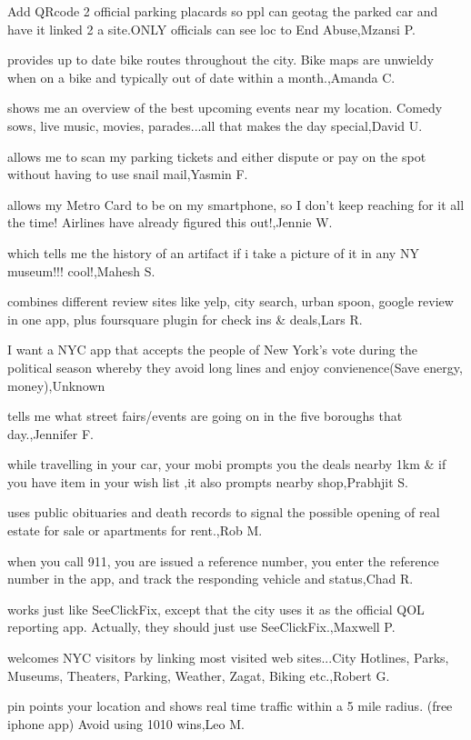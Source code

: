 \documentclass{article}
\begin{document}
Add QRcode 2 official parking placards so ppl can geotag the parked car and have it linked 2 a site.ONLY  officials can see loc to End Abuse,Mzansi P.

provides up to date bike routes throughout the city.  Bike maps are unwieldy when on a bike and typically out of date within a month.,Amanda C.

shows me an overview of the best upcoming events near my location. Comedy sows, live music, movies, parades...all that makes the day special,David U.

allows me to scan my parking tickets and either dispute or pay on the spot without having to use snail mail,Yasmin F.

allows my Metro Card to be on my smartphone, so I don't keep reaching for it all the time!  Airlines have already figured this out!,Jennie W.

which tells me the history of an artifact if i take a picture of it in any NY museum!!! cool!,Mahesh S.

combines different review sites like yelp, city search, urban spoon, google review in one app, plus foursquare plugin for check ins \& deals,Lars R.

I want a NYC app that accepts the people of New York's vote during the political season whereby they avoid long lines and enjoy convienence(Save energy, money),Unknown

tells me what street fairs/events are going on in the five boroughs that day.,Jennifer F.

while travelling in your car, your mobi prompts you the deals nearby 1km \& if you have item in your wish list ,it also prompts nearby shop,Prabhjit S.

uses public obituaries and death records to signal the possible opening of real estate for sale or apartments for rent.,Rob M.

when you call 911, you are issued a reference number, you enter the reference number in the app, and track the responding vehicle and status,Chad R.

works just like SeeClickFix, except that the city uses it as the official QOL reporting app.  Actually, they should just use SeeClickFix.,Maxwell P.

welcomes NYC visitors by linking most visited web sites...City Hotlines, Parks, Museums, Theaters, Parking, Weather, Zagat, Biking etc.,Robert G.

pin points your location and shows real time traffic within a 5 mile radius.  (free iphone app) Avoid using 1010 wins,Leo M.
\end{document}
